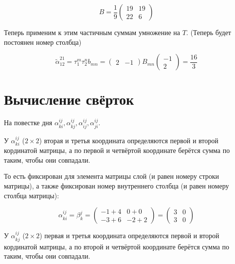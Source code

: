 \documentclass[12pt, a4paper]{article}
\begin{document}
    \begin{equation}
        B = \frac{1}{9} \begin{pmatrix}
            19 & 19 \\
            22 & 6
        \end{pmatrix}
    \end{equation}

    Теперь применим к этим частичным суммам умножение на $T$. (Теперь будет постоянен номер столбца)

    \begin{equation}
        \tilde{\alpha}_{12}^{21} = \tau_{1}^{m} \tau_{2}^{n} b_{m n} = 
        \begin{pmatrix} 2 & -1 \end{pmatrix} B_{mn} \begin{pmatrix} -1 \\ 2 \end{pmatrix} 
        = \frac{16}{3}
    \end{equation}

    \section{Вычисление свёрток}

    На повестке дня $\alpha^{ij}_{ki}, \alpha^{ij}_{kj}, \alpha^{ij}_{ij}, \alpha^{ij}_{ji}$.

    У $\alpha^{ij}_{ki}$ ($2\times 2$) вторая и третья координата 
    определяются первой и второй кординатой матрицы, а по первой и четвёртой координате берётся сумма по таким, 
    чтобы они совпадали.

    То есть фиксирован для элемента матрицы слой (и равен номеру строки матрицы), 
    а также фиксирован номер внутреннего столбца (и равен номеру столбца матрицы):

    \begin{equation}
        \alpha^{ij}_{ki} = \beta^{j}_{k} = \begin{pmatrix}
            -1 + 4 & 0 + 0 \\
            -3 + 6 & -2 + 2
        \end{pmatrix} = \begin{pmatrix}
            3 & 0 \\
            3 & 0
        \end{pmatrix}
    \end{equation}

    У $\alpha^{ij}_{kj}$ ($2\times 2$) первая и третья координата 
    определяются первой и второй кординатой матрицы, а по второй и четвёртой координате берётся сумма по таким, 
    чтобы они совпадали.
\end{document}
